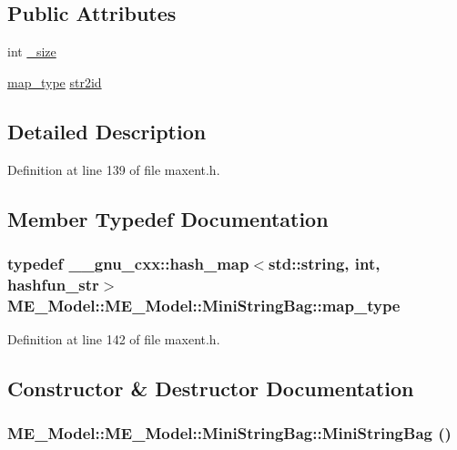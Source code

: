 \subsection*{Public Attributes}
\begin{CompactItemize}
\item 
int \hyperlink{structME__Model_1_1MiniStringBag_cb5332a124dfcfc8d5b2f5f7881e8d3c}{\_\-size}
\item 
\hyperlink{structME__Model_1_1MiniStringBag_a0c098ef108c4d6f43a5034a52347bd1}{map\_\-type} \hyperlink{structME__Model_1_1MiniStringBag_b2bc1743c292dfbf4c3953875bb97309}{str2id}
\end{CompactItemize}


\subsection{Detailed Description}


Definition at line 139 of file maxent.h.

\subsection{Member Typedef Documentation}
\hypertarget{structME__Model_1_1MiniStringBag_a0c098ef108c4d6f43a5034a52347bd1}{
\subsubsection[{map\_\-type}]{\setlength{\rightskip}{0pt plus 5cm}typedef \_\-\_\-gnu\_\-cxx::hash\_\-map$<$std::string, int, {\bf hashfun\_\-str}$>$ ME\_\-Model::ME\_\-Model::MiniStringBag::map\_\-type}}
\label{structME__Model_1_1MiniStringBag_a0c098ef108c4d6f43a5034a52347bd1}




Definition at line 142 of file maxent.h.

\subsection{Constructor \& Destructor Documentation}
\hypertarget{structME__Model_1_1MiniStringBag_652ba915492ef9b3144cc38fe014651e}{
\subsubsection[{MiniStringBag}]{\setlength{\rightskip}{0pt plus 5cm}ME\_\-Model::ME\_\-Model::MiniStringBag::MiniStringBag ()}}
\label{structME__Model_1_1MiniStringBag_652ba915492ef9b3144cc38fe014651e}





